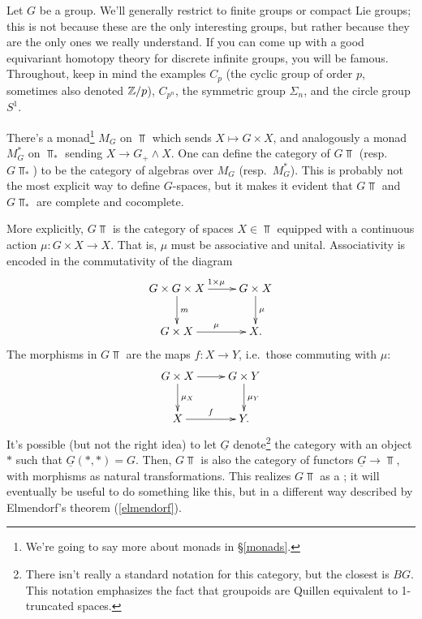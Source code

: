 Let $G$ be a group. We'll generally restrict to finite groups or compact Lie groups; this is not because these are
the only interesting groups, but rather because they are the only ones we really understand. If you can come up
with a good equivariant homotopy theory for discrete infinite groups, you will be famous. Throughout, keep in mind
the examples $C_p$ (the cyclic group of order $p$, sometimes also denoted $\mathbb Z/p$), $C_{p^n}$, the
symmetric group $\Sigma_n$, and the circle group $S^1$.

There's a monad\footnote{We're going to say more about monads in \S\ref{monads}.}  $M_G$ on $\Top$
which sends $X\mapsto G\times X$, and analogously a monad $M_G^*$ on $\Top_*$ sending $X\to G_+\land X$. One can
define the category of  $G\Top$ (resp.\  $G\Top_*$) to be the category of algebras over $M_G$ (resp.\ $M_G^*$). This is probably not the most
explicit way to define $G$-spaces, but it makes it evident that $G\Top$ and $G\Top_*$ are complete and cocomplete.

More explicitly, $G\Top$ is the category of spaces $X\in\Top$ equipped with a continuous action $\mu\colon G\times
X\to X$. That is, $\mu$ must be associative and unital. Associativity is encoded in the commutativity of the
diagram
\[\xymatrix{
	G\times G\times X\ar[r]^{1\times\mu}\ar[d]^m & G\times X\ar[d]^\mu\\
	G\times X\ar[r]^\mu & X.
}\]
The morphisms in $G\Top$ are the  maps $f\colon X\to Y$, i.e.\ those
commuting with $\mu$:
\[\xymatrix{
	G\times X\ar[r]\ar[d]^{\mu_X} & G\times Y\ar[d]^{\mu_Y}\\
	X\ar[r]^f & Y.
}\]
It's possible (but not the right idea) to let $\underline G$ denote\footnote{There isn't really a standard notation for this category, but the closest is $BG$. This notation emphasizes the fact that groupoids are Quillen equivalent to 1-truncated spaces.} the category with an object $*$ such that
$\underline G(*, *) = G$. Then, $G\Top$ is also the category of functors $\underline G\to\Top$, with morphisms as
natural transformations. This realizes $G\Top$ as a ; it will eventually be useful to do
something like this, but in a different way described by Elmendorf's theorem (\cref{elmendorf}).

